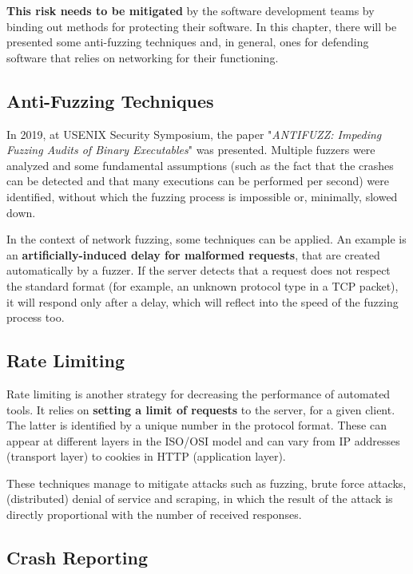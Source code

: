 \documentclass[10pt,a4paper,english,onecolumn]{IEEEtran}
\begin{document}
\textbf{This risk needs to be mitigated} by the software development teams by binding out methods for protecting their software. In this chapter, there will be presented some anti-fuzzing techniques and, in general, ones for defending software that relies on networking for their functioning.

\subsection{Anti-Fuzzing Techniques}

In 2019, at USENIX Security Symposium, the paper "\textit{ANTIFUZZ: Impeding Fuzzing Audits of Binary Executables}" \cite{antifuzz} was presented. Multiple fuzzers were analyzed and some fundamental assumptions (such as the fact that the crashes can be detected and that many executions can be performed per second) were identified, without which the fuzzing process is impossible or, minimally, slowed down.

In the context of network fuzzing, some techniques can be applied. An example is an \textbf{artificially-induced delay for malformed requests}, that are created automatically by a fuzzer. If the server detects that a request does not respect the standard format (for example, an unknown protocol type in a TCP packet), it will respond only after a delay, which will reflect into the speed of the fuzzing process too.

\subsection{Rate Limiting}

Rate limiting is another strategy for decreasing the performance of automated tools. It relies on \textbf{setting a limit of requests} to the server, for a given client. The latter is identified by a unique number in the protocol format. These can appear at different layers in the ISO/OSI model and can vary from IP addresses (transport layer) to cookies in HTTP (application layer).

These techniques manage to mitigate attacks such as fuzzing, brute force attacks, (distributed) denial of service and scraping, in which the result of the attack is directly proportional with the number of received responses.

\subsection{Crash Reporting}
\end{document}
